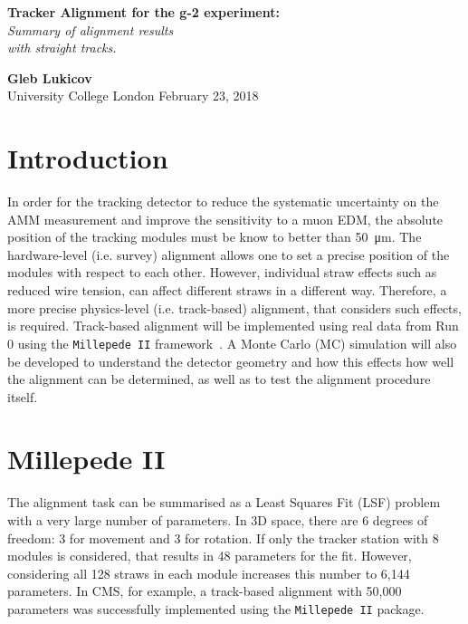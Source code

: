 \documentclass[a4paper,11pt]{article}
\begin{document}
\thispagestyle{empty}
\begin{titlepage}
\begin{center}
\end{center}
\begin{center}
	\vspace{1cm}
	{\huge \textbf{Tracker Alignment for the g-2 experiment:} \\ \textit{Summary of alignment results \\ with straight tracks.}}\\
	\vspace{1.5cm}

	\vspace{6cm}
	{\LARGE\bf Gleb Lukicov}\\
	{\Large University College London}
	\vspace{4cm}
	\vfill
	\vspace{0.9cm}
	{\large February 23, 2018}
\end{center}
\end{titlepage}
\clearpage

\thispagestyle{plain}

\clearpage
\section{Introduction}
In order for the tracking detector to reduce the systematic uncertainty on the AMM measurement and improve the sensitivity to a muon EDM, the absolute position of the tracking modules must be know to better than \SI{50}{\micro\metre}. The hardware-level (i.e. survey) alignment allows one to set a precise position of the modules with respect to each other. However, individual straw effects such as reduced wire tension, can affect different straws in a different way. Therefore, a more precise physics-level (i.e. track-based) alignment, that considers such effects, is required. Track-based alignment will be implemented using real data from Run 0 using the \texttt{Millepede II} framework~\cite{mp2}. A Monte Carlo (MC) simulation will also be developed to understand the detector geometry and how this effects how well the alignment can be determined, as well as to test the alignment procedure itself. 

\section{Millepede II}
The alignment task can be summarised as a Least Squares Fit (LSF) problem with a very large number of parameters. In 3D space, there are 6 degrees of freedom: 3 for movement and 3 for rotation. If only the tracker station with 8 modules is considered, that results in 48 parameters for the fit. However, considering all 128 straws in each module increases this number to 6,144 parameters. In CMS, for example, a track-based alignment with 50,000 parameters was successfully implemented \cite{CMS} using the \texttt{Millepede II} package. 
\end{document}
